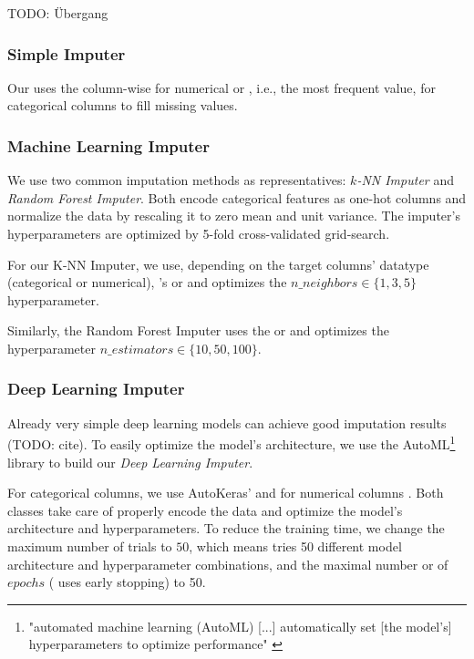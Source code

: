 TODO: Übergang


\subsubsection{Simple Imputer}
%
Our  uses the column-wise  for numerical or , i.e., the most frequent value,  for categorical columns to fill missing values.


\subsubsection{Machine Learning Imputer}
%
We use two common imputation methods as representatives: $k$\emph{-NN Imputer} and \emph{Random Forest Imputer}. Both encode categorical features as one-hot columns and normalize the data by rescaling it to zero mean and unit variance. The imputer's hyperparameters are optimized by 5-fold cross-validated grid-search.

For our K-NN Imputer, we use, depending on the target columns' datatype (categorical or numerical), 's  or  and optimizes the $n\_neighbors \in \{1, 3, 5\}$  hyperparameter.

Similarly, the Random Forest Imputer uses the  or  and optimizes the hyperparameter $n\_estimators \in \{10, 50, 100\}$.


\subsubsection{Deep Learning Imputer}
%
Already very simple deep learning models can achieve good imputation results (TODO: cite). To easily optimize the model's architecture, we use the AutoML\footnote{"automated machine learning (AutoML) [...] automatically set [the model's] hyperparameters to optimize performance" \cite{AutoML}} library  \citep{AutoKeras} to build our \emph{Deep Learning Imputer}.

For categorical columns, we use AutoKeras'  and for numerical columns . Both classes take care of properly encode the data and optimize the model's architecture and hyperparameters. To reduce the training time, we change the maximum number of trials to $50$, which means  tries 50 different model architecture and hyperparameter combinations, and the maximal number or of $epochs$ ( uses early stopping) to 50.


